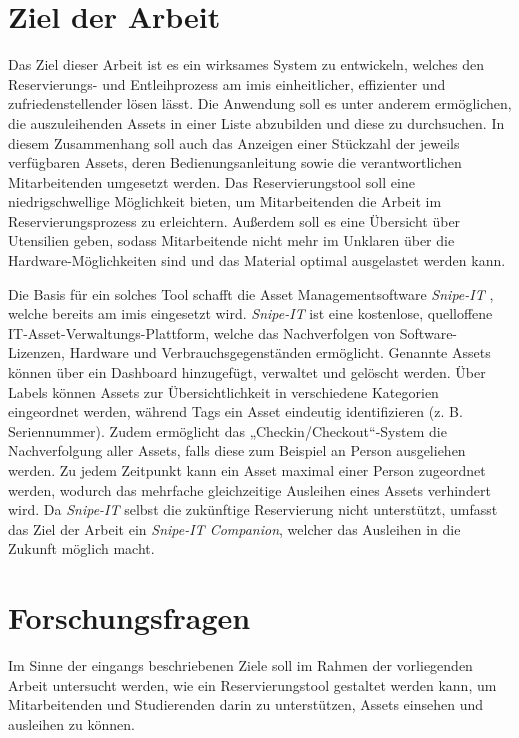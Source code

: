 \section{Ziel der Arbeit}
Das Ziel dieser Arbeit ist es ein wirksames System zu entwickeln, welches den Reservierungs- und
Entleihprozess am \ac{imis} einheitlicher, effizienter und zufriedenstellender lösen lässt. Die
Anwendung soll es unter anderem ermöglichen, die auszuleihenden Assets in einer Liste abzubilden und
diese zu durchsuchen. In diesem Zusammenhang soll auch das Anzeigen einer Stückzahl der jeweils
verfügbaren Assets, deren Bedienungsanleitung sowie die verantwortlichen Mitarbeitenden umgesetzt
werden. Das Reservierungstool soll eine niedrigschwellige Möglichkeit bieten, um Mitarbeitenden die
Arbeit im Reservierungsprozess zu erleichtern. Außerdem soll es eine Übersicht über Utensilien
geben, sodass Mitarbeitende nicht mehr im Unklaren über die Hardware-Möglichkeiten sind und das
Material optimal ausgelastet werden kann.

Die Basis für ein solches Tool schafft die Asset Managementsoftware \textit{Snipe-IT}
\cite{noauthor_home_nodate}, welche bereits am \ac{imis} eingesetzt wird. \textit{Snipe-IT} ist eine
kostenlose, quelloffene IT-Asset-Verwaltungs-Plattform, welche das Nachverfolgen von
Software-Lizenzen, Hardware und Verbrauchsgegenständen ermöglicht. Genannte Assets können über ein
Dashboard hinzugefügt, verwaltet und gelöscht werden. Über Labels können Assets zur
Übersichtlichkeit in verschiedene Kategorien eingeordnet werden, während Tags ein Asset eindeutig
identifizieren (z. B. Seriennummer). Zudem ermöglicht das „Checkin/Checkout“-System die
Nachverfolgung aller Assets, falls diese zum Beispiel an Person ausgeliehen werden. Zu jedem
Zeitpunkt kann ein Asset maximal einer Person zugeordnet werden, wodurch das mehrfache gleichzeitige
Ausleihen eines Assets verhindert wird. Da \textit{Snipe-IT} selbst die zukünftige Reservierung
nicht unterstützt, umfasst das Ziel der Arbeit ein \textit{Snipe-IT Companion}, welcher das
Ausleihen in die Zukunft möglich macht.


\section{Forschungsfragen}
Im Sinne der eingangs beschriebenen Ziele soll im Rahmen der vorliegenden Arbeit untersucht werden,
wie ein Reservierungstool gestaltet werden kann, um Mitarbeitenden und Studierenden darin zu
unterstützen, Assets einsehen und ausleihen zu können.

